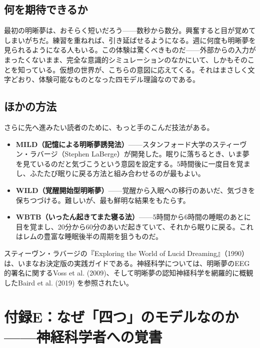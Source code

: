 \documentclass[11pt, twoside, openright]{book}
\begin{document}
\section*{何を期待できるか}

最初の明晰夢は、おそらく短いだろう------数秒から数分。興奮すると目が覚めてしまいがちだ。練習を重ねれば、引き延ばせるようになる。週に何度も明晰夢を見られるようになる人もいる。この体験は驚くべきものだ------外部からの入力がまったくないまま、完全な意識的シミュレーションのなかにいて、しかもそのことを知っている。仮想の世界が、こちらの意図に応えてくる。それはまさしく文字どおり、体験可能なものとなった四モデル理論なのである。

\section*{ほかの方法}

さらに先へ進みたい読者のために、もっと手のこんだ技法がある。

\begin{itemize}
  \item \textbf{MILD（記憶による明晰夢誘発法）}------スタンフォード大学のスティーヴン・ラバージ（Stephen LaBerge）が開発した。眠りに落ちるとき、いま夢を見ているのだと気づこうという意図を設定する。5時間後に一度目を覚まし、ふたたび眠りに戻る方法と組み合わせるのが最もよい。
  \item \textbf{WILD（覚醒開始型明晰夢）}------覚醒から入眠への移行のあいだ、気づきを保ちつづける。難しいが、最も鮮明な結果をもたらす。
  \item \textbf{WBTB（いったん起きてまた寝る法）}------5時間から6時間の睡眠のあとに目を覚まし、20分から60分のあいだ起きていて、それから眠りに戻る。これはレムの豊富な睡眠後半の周期を狙うものだ。
\end{itemize}

スティーヴン・ラバージの『Exploring the World of Lucid Dreaming』（1990）は、いまなお決定版の実践ガイドである。神経科学については、明晰夢のEEG的署名に関するVoss et al. (2009)、そして明晰夢の認知神経科学を網羅的に概観したBaird et al. (2019) を参照されたい。


\chapter*{付録E：なぜ「四つ」のモデルなのか------神経科学者への覚書}
\end{document}
